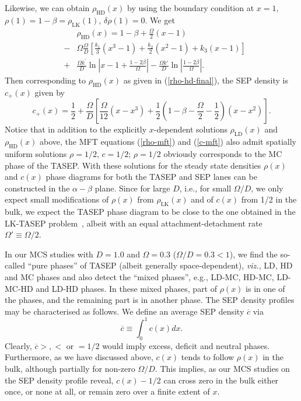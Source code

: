 \documentclass[aps,pre,twocolumn,superscriptaddress,amsmath,amssymb,longbibliography,floatfix,nofootinbib]{revtex4}
\begin{document}
{Likewise, we can obtain $\rho_\text{HD}(x)$ by using the boundary condition at $x=1$, $\rho(1)=1-\beta=\rho_\text{LK}(1),\,\delta \rho(1)=0$. We get
 \begin{eqnarray}
 &&\rho_\text{HD}(x)=1-\beta+\frac{\Omega}{2}(x-1)\nonumber \\&-&\Omega\frac{\Omega}{D}\left[\frac{k_1}{3}(x^3-1)+\frac{k_2}{2}(x^2-1)+k_3(x-1)\right]\nonumber  \\
 &+&\frac{\Omega k^\prime}{D}\ln \left|x-1+\frac{1-2\beta}{\Omega} \right|-\frac{\Omega k'}{D}\ln \left|\frac{1-2\beta}{\Omega} \right|. \label{rho-hd-final}
\end{eqnarray}
Then corresponding to $\rho_\text{HD}(x)$ as given in (\ref{rho-hd-final}), the SEP density is $c_+(x)$ given by
\begin{equation}
 c_+(x)= \frac{1}{2} + \frac{\Omega}{D}\left[\frac{\Omega}{12}(x-x^3)+\frac{1}{2}\left(1-\beta-\frac{\Omega}{2}-\frac{1}{2}\right)(x-x^2)\right].\label{c-plus}
\end{equation}
Notice that in addition to the explicitly $x$-dependent solutions $\rho_\text{LD}(x)$ and $\rho_\text{HD}(x)$ above, the MFT equations (\ref{rho-mft}) and (\ref{c-mft}) also admit spatially uniform solutions $\rho=1/2,\,c=1/2$; $\rho=1/2$ obviously corresponds to the MC phase of the TASEP.
With these solutions for the steady state densities $\rho(x)$ and $c(x)$ phase diagrams for both the TASEP and SEP lanes can be constructed in the $\alpha-\beta$ plane. Since for large $D$, i.e., for small $\Omega/D$, we only expect small modifications of $\rho(x)$ from $\rho_\text{LK}(x)$ and of $c(x)$ from 1/2 in the bulk, we expect the TASEP phase diagram to be close to the one obtained in the LK-TASEP problem~\cite{frey-lktasep}, albeit with an equal attachment-detachment rate $\Omega'\equiv \Omega/2$.  






In our MCS studies with $D=1.0$ and $\Omega=0.3$ ($\Omega/D=0.3 < 1$), we find the so-called ``pure phases'' of TASEP (albeit generally space-dependent), {\em viz.}, LD, HD and MC phases and also detect the ``mixed phases'', e.g., LD-MC, HD-MC, LD-MC-HD and LD-HD phases. In these mixed phases, part of $\rho(x)$ is in one of the phases, and the remaining part is in another phase. The SEP density profiles may be characterised as follows. We define an average SEP density $\overline c$ via
\begin{equation}
 \overline c\equiv \int_0^1 c(x) dx.\label{mean-sep}
\end{equation}
Clearly, $\overline c>,<$ or $=1/2$ would imply excess, deficit and neutral phases. Furthermore, as we have discussed above, $c(x)$ tends to follow $\rho(x)$ in the bulk, although partially for non-zero $\Omega/D$. This implies, as our MCS studies on the SEP density profile reveal, $c(x)-1/2$ can cross zero in the bulk either once, or none at all, or remain zero over a finite extent of $x$.

}
\end{document}
